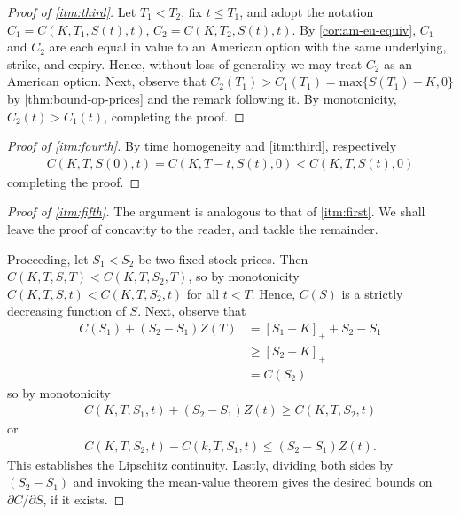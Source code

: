 \documentclass[12pt]{amsbook}
\newcommand{\p}{\partial}
\theoremstyle{plain}
\theoremstyle{definition}
\theoremstyle{remark}
\numberwithin{equation}{section}  %
\begin{document}
\begin{proof}[Proof of \cref{itm:third}]
	Let $T_{1} < T_{2}$, fix $t \le T_{1}$, and
	adopt the notation
	\\ $C_{1} = C(K, T_{1}, S(t), t)$, $C_{2} = C(K, T_{2}, S(t), t)$.  
	By \cref{cor:am-eu-equiv}, $C_{1}$ and $C_{2}$ are each equal in value to
	an American option with the same underlying, strike, and expiry. Hence,
	without loss of generality we
	may treat $C_{2}$ as an American option. Next, observe
	that $C_{2}(T_{1}) > C_{1}(T_{1}) = \text{max}\{S(T_{1})-K, 0\}$
	by \cref{thm:bound-op-prices} and the remark following it.
	By monotonicity, $C_{2}(t) >  
	C_{1}(t)$, completing the proof. 
\end{proof}
\begin{proof}[Proof of \cref{itm:fourth}]
	By time homogeneity and \cref{itm:third}, respectively
	\begin{equation*}
		\begin{split}
			C(K, T, S(0), t) = C(K, T-t, S(t), 0) < C(K, T, S(t), 0)
		\end{split}
	\end{equation*}
	completing the proof.
\end{proof}
\begin{proof}[Proof of \cref{itm:fifth}]
	The argument is analogous to that of \cref{itm:first}. We shall leave
	the proof of concavity to the reader, and tackle the remainder.

	Proceeding,
	let $S_{1} < S_{2}$ be two fixed stock prices. Then $C(K, T, S, T) <
	C(K, T, S_{2}, T)$, so by monotonicity
	$C(K, T, S, t) < C(K, T, S_{2}, t)$ for all $t < T$. Hence,
	$C(S)$ is a strictly decreasing function of $S$. Next, observe that
	\begin{equation*}
		\begin{split}
			C(S_{1}) + (S_{2} - S_{1})Z(T) 
			& = {[S_{1} - K]}_{+} + S_{2} - S_{1}
			\\
			& \ge {[S_{2} - K]}_{+}
			\\
			& = C(S_{2})
		\end{split}
	\end{equation*}
	so by monotonicity
	\begin{equation*}
		\begin{split}
			C(K, T, S_{1}, t) + (S_{2} - S_{1})Z(t) \ge C(K, T, S_{2}, t)
		\end{split}
	\end{equation*}
	or
	\begin{equation*}
		\begin{split}
			C(K, T, S_{2}, t) - C(k, T, S_{1}, t) \le (S_{2} - S_{1})Z(t).
		\end{split}
	\end{equation*}
	This establishes the Lipschitz continuity. Lastly, dividing both sides by
	$(S_{2} - S_{1})$ and invoking the mean-value theorem
	gives the desired bounds on $\p C/ \p S$, if it exists.
\end{proof}
\end{document}
